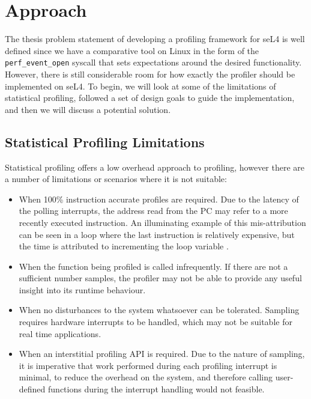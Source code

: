 \chapter{Approach}\label{ch:approach}

The thesis problem statement of developing a profiling framework for seL4 is well defined since we have a comparative tool on Linux in the form of the \texttt{perf\_event\_open} syscall that sets expectations around the desired functionality. However, there is still considerable room for how exactly the profiler should be implemented on seL4. To begin, we will look at some of the limitations of statistical profiling, followed a set of design goals to guide the implementation, and then we will discuss a potential solution.

\section{Statistical Profiling Limitations}

Statistical profiling offers a low overhead approach to profiling, however there are a number of limitations or scenarios where it is not suitable:

\begin{itemize}
    \item When 100\% instruction accurate profiles are required. Due to the latency of the polling interrupts, the address read from the PC may refer to a more recently executed instruction. An illuminating example of this mis-attribution can be seen in a loop where the last instruction is relatively expensive, but the time is attributed to incrementing the loop variable \cite{DocsOProfileInter}.
    \item When the function being profiled is called infrequently. If there are not a sufficient number samples, the profiler may not be able to provide any useful insight into its runtime behaviour.
    \item When no disturbances to the system whatsoever can be tolerated. Sampling requires hardware interrupts to be handled, which may not be suitable for real time applications.
    \item When an interstitial profiling API is required. Due to the nature of sampling, it is imperative that work performed during each profiling interrupt is minimal, to reduce the overhead on the system, and therefore calling user-defined functions during the interrupt handling would not feasible.
\end{itemize}

